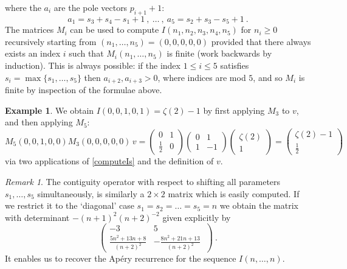 \documentclass[a4paper,10pt]{amsart}
\theoremstyle{definition}
\newtheorem{example}[thm]{Example}
\theoremstyle{remark}
\newtheorem{rem}[thm]{Remark}
\numberwithin{equation}{section}
\newcommand{\0}{\color{blue}{\mathsf{0}}}
\begin{document}
where the $a_i$ are the pole vectors $p_{i+1}+1$: 
\[ {a_1 = s_3 + s_4 - s_1 + 1 \ ,  \ \ldots \  , \   a_5 = s_2 + s_3 - s_5 + 1}\ . \]
The matrices $M_i$ can be used to compute $I(n_1,n_2,n_3,n_4,n_5)$ for $n_i\geq 0$ recursively   starting from $(n_1,\ldots, n_5) = (0,0,0,0,0)$  provided   that 
there always exists an index $i$ such that $M_i(n_1,\ldots, n_5)$  is finite (work backwards by induction).  This is always possible: if the index $1\leq i \leq 5$ satisfies $s_i = \max\{s_1,\ldots, s_5\}$ then $a_{i+2},a_{i+3}>0$, where indices are mod $5$, and so $M_i$ is finite by inspection of the formulae above.


%


\begin{example} We obtain $I(0,0,1,0,1)= \zeta(2)-1$ by first applying $M_3$ to $v$, and then applying $M_5$: 
\[ M_5(0,0,1,0,0) M_3(0,0,0,0,0)\,  v =\begin{pmatrix}  0 & 1 \\  \frac{1}{2} & 0  \end{pmatrix}  \begin{pmatrix}  0 & 1 \\ 1 & -1 \end{pmatrix}  \begin{pmatrix} \zeta(2) \\ 1 \end{pmatrix}  = \begin{pmatrix}  \zeta(2)-1 \\ \frac{1}{2} \end{pmatrix} \]
via two applications of \eqref{computeIs} and the definition of $v$. 
\end{example}



\begin{rem}
The contiguity operator with respect to shifting all parameters $s_1,\ldots, s_5$ simultaneously, is similarly a $2\times 2$ matrix which is  easily  computed. If we restrict it to the `diagonal' case $s_1=s_2=\ldots = s_5=n$ we obtain the matrix with determinant  $-(n+1)^2(n+2)^{-2}$ given explicitly by
\[\begin{pmatrix} 
-3 &  5 \\
\frac{5n^2+13n +8}{(n+2)^2}  &  - \frac{8n^2+21n+13}{(n+2)^2}\
\end{pmatrix}\ .  \]
  It enables us  to recover   the Ap\'ery recurrence for the sequence $I(n,\ldots, n)$. 
\end{rem}



\renewcommand\refname{References}




\end{document}
